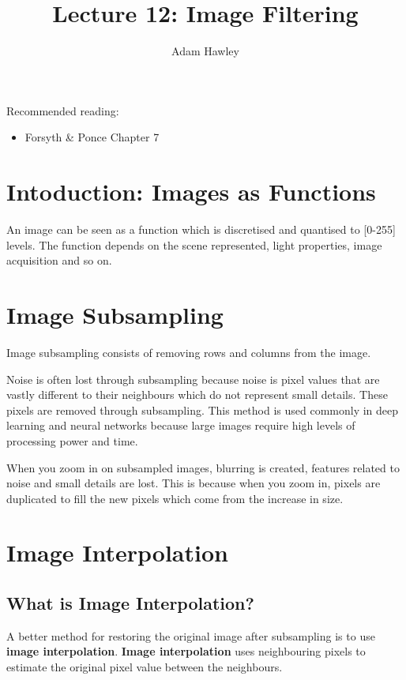 \documentclass{article}
\author{Adam Hawley}
\title{Lecture 12: Image Filtering}
\begin{document}
\maketitle
Recommended reading:
\begin{itemize}
	\item Forsyth \& Ponce Chapter 7
\end{itemize}
\tableofcontents
\newpage

\section{Intoduction: Images as Functions}
An image can be seen as a function which is discretised and quantised to [0-255] levels.
The function depends on the scene represented, light properties, image acquisition and so on.

\section{Image Subsampling}
Image subsampling consists of removing rows and columns from the image.

Noise is often lost through subsampling because noise is pixel values that are vastly different to their neighbours which do not represent small details.
These pixels are removed through subsampling.
This method is used commonly in deep learning and neural networks because large images require high levels of processing power and time.

When you zoom in on subsampled images, blurring is created, features related to noise and small details are lost.
This is because when you zoom in, pixels are duplicated to fill the new pixels which come from the increase in size.

\section{Image Interpolation}
\subsection{What is Image Interpolation?}
A better method for restoring the original image after subsampling is to use \textbf{image interpolation}.
\textbf{Image interpolation} uses neighbouring pixels to estimate the original pixel value between the neighbours.
\end{document}
